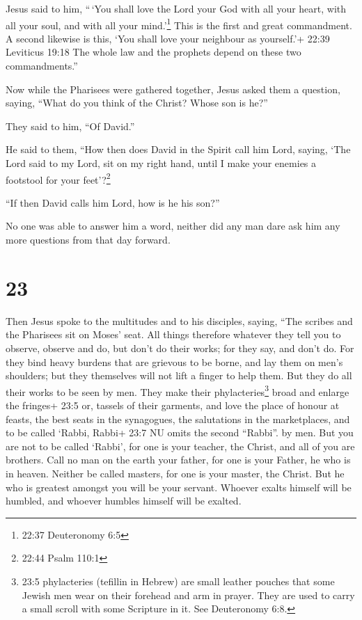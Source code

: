 Jesus said to him, ``\,`You shall love the Lord your God
with all your heart, with all your soul, and with all your
mind.'\footnote{22:37 Deuteronomy 6:5}  This is the first
and great commandment.  A second likewise is this, `You
shall love your neighbour as yourself.'+ 22:39 Leviticus 19:18
 The whole law and the prophets depend on these two
commandments.''

 Now while the Pharisees were gathered together, Jesus
asked them a question,  saying, ``What do you think of the
Christ? Whose son is he?''

They said to him, ``Of David.''

 He said to them, ``How then does David in the Spirit call
him Lord, saying,  `The Lord said to my Lord, sit on my
right hand, until I make your enemies a footstool for your
feet'?\footnote{22:44 Psalm 110:1}

 ``If then David calls him Lord, how is he his son?''

 No one was able to answer him a word, neither did any man
dare ask him any more questions from that day forward.

\hypertarget{section-22}{%
\section{23}\label{section-22}}

 Then Jesus spoke to the multitudes and to his disciples,
 saying, ``The scribes and the Pharisees sit on Moses' seat.
 All things therefore whatever they tell you to observe,
observe and do, but don't do their works; for they say, and don't do.
 For they bind heavy burdens that are grievous to be borne,
and lay them on men's shoulders; but they themselves will not lift a
finger to help them.  But they do all their works to be seen
by men. They make their phylacteries\footnote{23:5 phylacteries
  (tefillin in Hebrew) are small leather pouches that some Jewish men
  wear on their forehead and arm in prayer. They are used to carry a
  small scroll with some Scripture in it. See Deuteronomy 6:8.} broad
and enlarge the fringes+ 23:5 or, tassels of their garments,
 and love the place of honour at feasts, the best seats in
the synagogues,  the salutations in the marketplaces, and to
be called `Rabbi, Rabbi+ 23:7 NU omits the second ``Rabbi''. by men.
 But you are not to be called `Rabbi', for one is your
teacher, the Christ, and all of you are brothers.  Call no
man on the earth your father, for one is your Father, he who is in
heaven.  Neither be called masters, for one is your master,
the Christ.  But he who is greatest amongst you will be
your servant.  Whoever exalts himself will be humbled, and
whoever humbles himself will be exalted.

